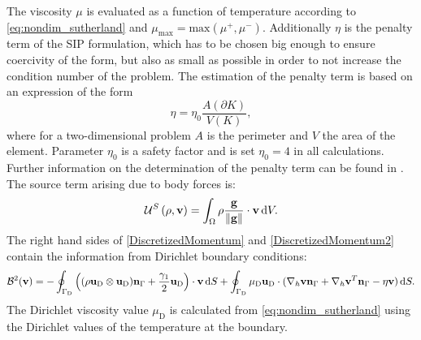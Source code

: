 The viscosity $\mu$ is evaluated as a function of temperature according to \cref{eq:nondim_sutherland} and $\mu_{\text{max}} = \text{max}(\mu^{+}, \mu^{-})$.  Additionally  $\eta$ is the penalty term of the SIP formulation, which has to be chosen big enough to ensure coercivity of the form, but also as small as possible in order to not increase the condition number of the problem. The estimation of the penalty term is based on an expression of the form
\begin{equation}
\eta = \eta_0 \frac{A(\partial K)}{V(K)},
\end{equation}
where for a two-dimensional problem $A$ is the perimeter and $V$ the area of the element. Parameter $\eta_0$ is a safety factor and is set $\eta_0 = 4$ in all calculations. Further information on the determination of the penalty term can be found in  \cite{hillewaertDevelopmentDiscontinuousGalerkin2013b}.
The source term arising due to body forces is:
\begin{equation}
\mathcal{U}^S\left(\rho, \textbf{v}\right) =  \int_{\Omega}{  \rho \frac{\textbf{g}}{\Vert \textbf{g} \Vert}\cdot \textbf{v}} \,\mathrm{d} V.  \label{eq:Mom_source}	
\end{equation}
The right hand sides of \cref{DiscretizedMomentum} and \cref{DiscretizedMomentum2} contain the information from Dirichlet boundary conditions:
\begin{equation}
\mathcal{B}^2(\textbf{v}) = 
-\oint_{\Gamma_{\text{D}}}{ \left( (\rho\textbf{u}_{\text{D}}\otimes\textbf{u}_{\text{D}} )\textbf{n}_{\Gamma} + \frac{\gamma_1}{2}\textbf{u}_{\text{D}}\right)\cdot\textbf{v} \,\mathrm{d} S}  +
\oint_{\Gamma_{\text{D}}}{\mu_{\text{D}}\textbf{u}_{\text{D}}\cdot(\nabla_h\textbf{v} \textbf{n}_{\Gamma} + \nabla_h\textbf{v}^T \textbf{n}_{\Gamma}- \eta \textbf{v} )\,\mathrm{d} S.}	
\end{equation}
The Dirichlet viscosity value $\mu_{\text{D}}$ is calculated from \cref{eq:nondim_sutherland} using the Dirichlet values of the temperature at the boundary.
